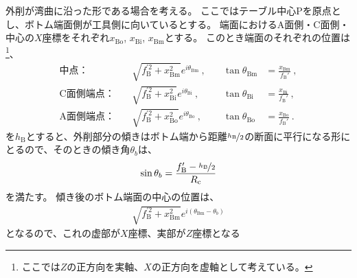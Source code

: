 \clearpage
外削が湾曲に沿った形である場合を考える。
ここではテーブル中心Pを原点とし、ボトム端面側が工具側に向いているとする。
端面におけるA面側・C面側・中心の$X$座標をそれぞれ$x_\mathrm{Bo}$, $x_\mathrm{Bi}$, $x_\mathrm{Bm}$とする。
このとき端面のそれぞれの位置は
\footnote{ここでは$Z$の正方向を実軸、$X$の正方向を虚軸として考えている。}、
\begin{subequations}
\begin{alignat*}{2}
  \text{中点：}&\quad
  \sqrt{f_\mathrm B^{'2}+x_\mathrm{Bm}^2}e^{i\theta_\mathrm{Bm}}~, \quad &
  \tan\theta_\mathrm{Bm} &= \frac{x_\mathrm{Bm}}{f_\mathrm B'}\ ,\\
  \text{C面側端点：}&\quad
  \sqrt{f_\mathrm B^{'2}+x_\mathrm{Bi}^2}e^{i\theta_\mathrm{Bi}}~, \quad &
  \tan\theta_\mathrm{Bi} &= \frac{x_\mathrm{Bi}}{f_\mathrm B'}\ ,\\
  \text{A面側端点：}&\quad
  \sqrt{f_\mathrm B^{'2}+x_\mathrm{Bo}^2}e^{i\theta_\mathrm{Bo}}~, \quad &
  \tan\theta_\mathrm{Bo} &= \frac{x_\mathrm{Bo}}{f_\mathrm B'}\ .
\end{alignat*}
\end{subequations}
\BottomOutcutLength を$h_\mathrm B$とすると、外削部分の傾きはボトム端から距離$\nicefrac{h_\mathrm B}2$の断面に平行になる形にとるので、そのときの傾き角$\theta_b$は、
\begin{align*}
  \sin\theta_b = \frac{f_\mathrm B'-\nicefrac{h_\mathrm B}2}{R_\mathrm c}
\end{align*}
を満たす。
傾き後のボトム端面の中心の位置は、
\begin{align*}
  \sqrt{f_\mathrm B^{'2}+x_\mathrm{Bm}^2}e^{i(\theta_\mathrm{Bm}-\theta_b)}
\end{align*}
となるので、これの虚部が$X$座標、実部が$Z$座標となる
